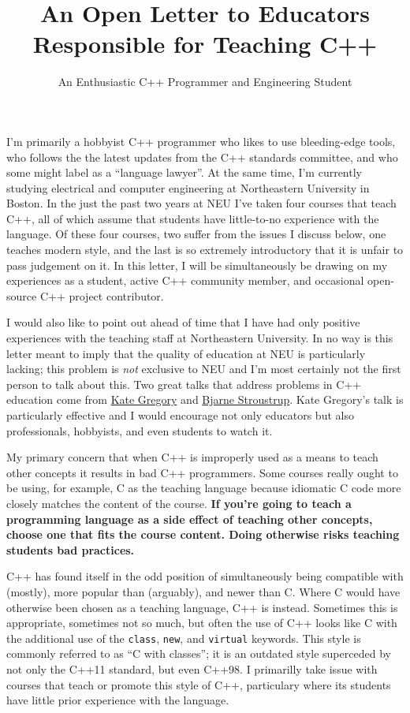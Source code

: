 \documentclass{article}
\title{An Open Letter to Educators Responsible for Teaching C++}
\author{An Enthusiastic C++ Programmer and Engineering Student}
\begin{document}
\raggedright
\maketitle

I'm primarily a hobbyist C++ programmer who likes to use bleeding-edge tools, who follows the the latest updates from the C++ standards committee, and who some might label as a ``language lawyer''.  At the same time, I'm currently studying electrical and computer engineering at Northeastern University in Boston.  In the just the past two years at NEU I've taken four courses that teach C++, all of which assume that students have little-to-no experience with the language.  Of these four courses, two suffer from the issues I discuss below, one teaches modern style, and the last is so extremely introductory that it is unfair to pass judgement on it.  In this letter, I will be simultaneously be drawing on my experiences as a student, active C++ community member, and occasional open-source C++ project contributor. 

I would also like to point out ahead of time that I have had only positive experiences with the teaching staff at Northeastern University.  In no way is this letter meant to imply that the quality of education at NEU is particularly lacking; this problem is \emph{not} exclusive to NEU and I'm most certainly not the first person to talk about this.  Two great talks that address problems in C++ education come from \href{https://www.youtube.com/watch?v=YnWhqhNdYyk}{Kate Gregory} and \href{https://www.youtube.com/watch?v=fX2W3nNjJIo}{Bjarne Stroustrup}.  Kate Gregory's talk is particularly effective and I would encourage not only educators but also professionals, hobbyists, and even students to watch it.

My primary concern that when C++ is improperly used as a means to teach other concepts it results in bad C++ programmers.  Some courses really ought to be using, for example, C as the teaching language because idiomatic C code more closely matches the content of the course.  \textbf{If you're going to teach a programming language as a side effect of teaching other concepts, choose one that fits the course content.  Doing otherwise risks teaching students bad practices.}  

C++ has found itself in the odd position of simultaneously being compatible with (mostly), more popular than (arguably), and newer than C.  Where C would have otherwise been chosen as a teaching language, C++ is instead.  Sometimes this is appropriate, sometimes not so much, but often the use of C++ looks like C with the additional use of the \lstinline{class}, \lstinline{new}, and \lstinline{virtual} keywords.  This style is commonly referred to as ``C with classes''; it is an outdated style superceded by not only the C++11 standard, but even C++98.  I primarilly take issue with courses that teach or promote this style of C++, particulary where its students have little prior experience with the language.
\end{document}
